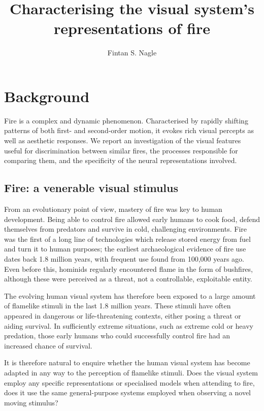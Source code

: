 \documentclass[a4paper]{article}
\title{Characterising the visual system's representations of fire}
\author{Fintan S. Nagle}
\begin{document}
\maketitle


\section{Background}


Fire is a complex and dynamic phenomenon. Characterised by rapidly shifting patterns of both first- and second-order motion, it evokes rich visual percepts as well as aesthetic responses. We report an investigation of the visual features useful for discrimination between similar fires, the processes responsible for comparing them, and the specificity of the neural representations involved.

\subsection*{Fire: a venerable visual stimulus}

From an evolutionary point of view, mastery of fire was key to human development. Being able to control fire allowed early humans to cook food, defend themselves from predators and survive in cold, challenging environments. Fire was the first of a long line of technologies which release stored energy from fuel and turn it to human purposes; the earliest archaeological evidence of fire use dates back 1.8 million years, with frequent use found from 100,000 years ago\cite{bowman2009fire}. Even before this, hominids regularly encountered flame in the form of bushfires, although these were perceived as a threat, not a controllable, exploitable entity.

The evolving human visual system has therefore been exposed to a large amount of flamelike stimuli in the last 1.8 million years. These stimuli have often appeared in dangerous or life-threatening contexts, either posing a threat or aiding survival. In sufficiently extreme situations, such as extreme cold or heavy predation, those early humans who could successfully control fire had an increased chance of survival.

It is therefore natural to enquire whether the human visual system has become adapted in any way to the perception of flamelike stimuli. Does the visual system employ any specific representations or specialised models when attending to fire, does it use the same general-purpose systems employed when observing a novel moving stimulus?
\end{document}
